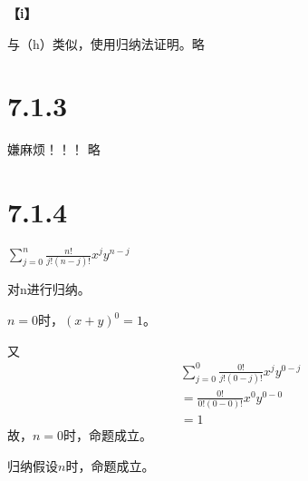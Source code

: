\documentclass{article}
\theoremstyle{mystyle}
\begin{document}
\textbf{【i】}

与（h）类似，使用归纳法证明。略

\section*{7.1.3}

嫌麻烦！！！ 略

\section*{7.1.4}
$\sum \limits_{j=0}^n \frac{n!}{j!(n-j)!} x^j y^{n-j}$

对n进行归纳。

$n=0$时，$(x+y)^0=1$。

\noindent 又
\begin{align*}
         & \sum \limits_{j=0}^0 \frac{0!}{j!(0-j)!} x^j y^{0-j} \\
         & = \frac{0!}{0!(0-0)!} x^0 y^{0-0}                    \\
         & = 1
\end{align*}
故，$n=0$时，命题成立。

归纳假设$n$时，命题成立。
\end{document}
